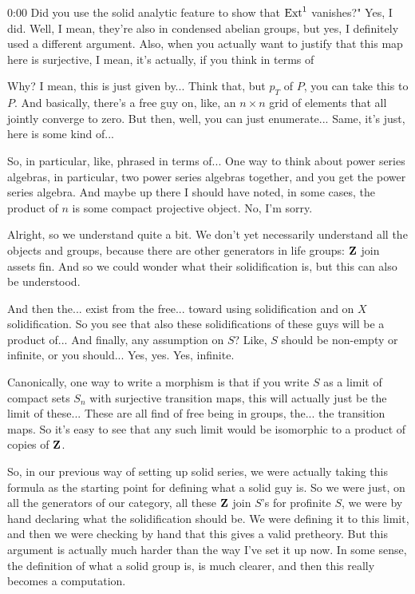 \begin{unfinished}{0:00}
Did you use the solid analytic feature to show that $\operatorname{Ext}^1$ vanishes?" Yes, I did. Well, I mean, they're also in condensed abelian groups, but yes, I definitely used a different argument. Also, when you actually want to justify that this map here is surjective, I mean, it's actually, if you think in terms of

Why? I mean, this is just given by... Think that, but $p_T$ of $P$, you can take this to $P$. And basically, there's a free guy on, like, an $n \times n$ grid of elements that all jointly converge to zero. But then, well, you can just enumerate... Same, it's just, here is some kind of...

So, in particular, like, phrased in terms of... One way to think about power series algebras, in particular, two power series algebras together, and you get the power series algebra. And maybe up there I should have noted, in some cases, the product of $n$ is some compact projective object. No, I'm sorry.

Alright, so we understand quite a bit. We don't yet necessarily understand all the objects and groups, because there are other generators in life groups: $\mathbf Z$ join assets fin. And so we could wonder what their solidification is, but this can also be understood.

And then the... exist from the free... toward using solidification and on $X$ solidification. So you see that also these solidifications of these guys will be a product of... And finally, any assumption on $S$? Like, $S$ should be non-empty or infinite, or you should... Yes, yes. Yes, infinite.

Canonically, one way to write a morphism is that if you write $S$ as a limit of compact sets $S_n$ with surjective transition maps, this will actually just be the limit of these... These are all find of free being in groups, the... the transition maps. So it's easy to see that any such limit would be isomorphic to a product of copies of $\mathbf Z$.

So, in our previous way of setting up solid series, we were actually taking this formula as the starting point for defining what a solid guy is. So we were just, on all the generators of our category, all these $\mathbf Z$ join $S$'s for profinite $S$, we were by hand declaring what the solidification should be. We were defining it to this limit, and then we were checking by hand that this gives a valid pretheory. But this argument is actually much harder than the way I've set it up now. In some sense, the definition of what a solid group is, is much clearer, and then this really becomes a computation.


\end{unfinished}
